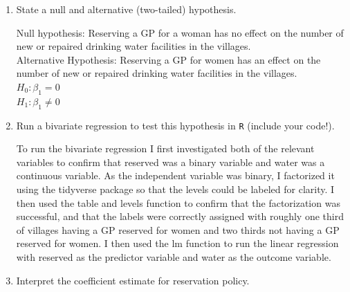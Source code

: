 \documentclass[12pt,letterpaper]{article}
\begin{document}
\begin{enumerate}
	\item [(a)] State a null and alternative (two-tailed) hypothesis. 
	
\noindent Null hypothesis: Reserving a GP for a woman has no effect on the number of new or repaired drinking water facilities in the villages. \\

\noindent Alternative Hypothesis: Reserving a GP for women has an effect on the number of new or repaired drinking water facilities in the villages. \\

\noindent $H_0: \beta_1 = 0 $ \\

\noindent $H_1: \beta_1 \neq 0 $ \\

	\item [(b)] Run a bivariate regression to test this hypothesis in \texttt{R} (include your code!).
	
\noindent To run the bivariate regression I first investigated both of the relevant variables to confirm that reserved was a binary variable and water was a continuous variable. As the independent variable was binary, I factorized it using the tidyverse package so that the levels could be labeled for clarity. I then used the table and levels function to confirm that the factorization was successful, and that the labels were correctly assigned with roughly one third of villages having a GP reserved for women and two thirds not having a GP reserved for women. I then used the lm function to run the linear regression with reserved as the predictor variable and water as the outcome variable. \\
	
	 
	
	 
	
	
	
	
	
	
	
	\item [(c)] Interpret the coefficient estimate for reservation policy.
	

\end{enumerate}
\end{document}
